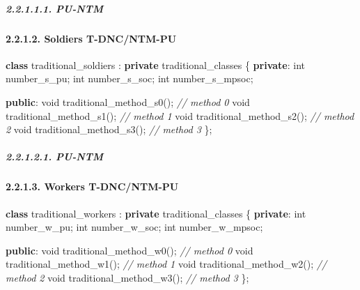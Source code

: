 \documentclass[
]{article}
\newenvironment{Shaded}{}{}
\newcommand{\CommentTok}[1]{\textcolor[rgb]{0.38,0.63,0.69}{\textit{#1}}}
\newcommand{\DataTypeTok}[1]{\textcolor[rgb]{0.56,0.13,0.00}{#1}}
\newcommand{\KeywordTok}[1]{\textcolor[rgb]{0.00,0.44,0.13}{\textbf{#1}}}
\newcommand{\NormalTok}[1]{#1}
\begin{document}
\hypertarget{pu-ntm}{%
\subparagraph{2.2.1.1.1. PU-NTM}\label{pu-ntm}}

\hypertarget{soldiers-t-dncntm-pu}{%
\paragraph{2.2.1.2. Soldiers T-DNC/NTM-PU}\label{soldiers-t-dncntm-pu}}

\begin{Shaded}
\begin{Highlighting}[]
\KeywordTok{class}\NormalTok{ traditional\_soldiers : }\KeywordTok{private}\NormalTok{ traditional\_classes \{}
   \KeywordTok{private}\NormalTok{:}
      \DataTypeTok{int}\NormalTok{ number\_s\_pu;}
      \DataTypeTok{int}\NormalTok{ number\_s\_soc;}
      \DataTypeTok{int}\NormalTok{ number\_s\_mpsoc;}

   \KeywordTok{public}\NormalTok{:}
      \DataTypeTok{void}\NormalTok{ traditional\_method\_s0();  }\CommentTok{// method 0}
      \DataTypeTok{void}\NormalTok{ traditional\_method\_s1();  }\CommentTok{// method 1}
      \DataTypeTok{void}\NormalTok{ traditional\_method\_s2();  }\CommentTok{// method 2}
      \DataTypeTok{void}\NormalTok{ traditional\_method\_s3();  }\CommentTok{// method 3}
\NormalTok{\};}
\end{Highlighting}
\end{Shaded}

\hypertarget{pu-ntm-1}{%
\subparagraph{2.2.1.2.1. PU-NTM}\label{pu-ntm-1}}

\hypertarget{workers-t-dncntm-pu}{%
\paragraph{2.2.1.3. Workers T-DNC/NTM-PU}\label{workers-t-dncntm-pu}}

\begin{Shaded}
\begin{Highlighting}[]
\KeywordTok{class}\NormalTok{ traditional\_workers : }\KeywordTok{private}\NormalTok{ traditional\_classes \{}
   \KeywordTok{private}\NormalTok{:}
      \DataTypeTok{int}\NormalTok{ number\_w\_pu;}
      \DataTypeTok{int}\NormalTok{ number\_w\_soc;}
      \DataTypeTok{int}\NormalTok{ number\_w\_mpsoc;}

   \KeywordTok{public}\NormalTok{:}
      \DataTypeTok{void}\NormalTok{ traditional\_method\_w0();  }\CommentTok{// method 0}
      \DataTypeTok{void}\NormalTok{ traditional\_method\_w1();  }\CommentTok{// method 1}
      \DataTypeTok{void}\NormalTok{ traditional\_method\_w2();  }\CommentTok{// method 2}
      \DataTypeTok{void}\NormalTok{ traditional\_method\_w3();  }\CommentTok{// method 3}
\NormalTok{\};}
\end{Highlighting}
\end{Shaded}
\end{document}
